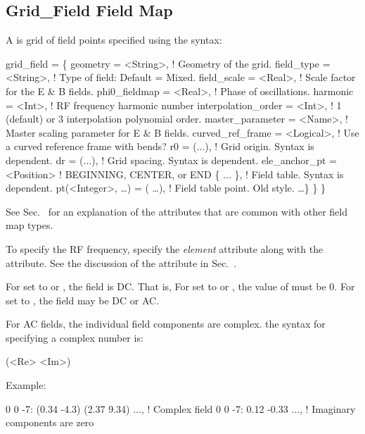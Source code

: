 \subsection{Grid_Field Field Map}
\label{s:grid.field}

A  is grid of field points specified using the syntax:
\begin{example}
  grid_field = \{ 
    geometry         = <String>,    ! Geometry of the grid.
    field_type       = <String>,    ! Type of field: Default = Mixed.
    field_scale      = <Real>,      ! Scale factor for the E & B fields.
    phi0_fieldmap    = <Real>,      ! Phase of oscillations.
    harmonic         = <Int>,       ! RF frequency harmonic number 
    interpolation_order = <Int>,    ! 1 (default) or 3 interpolation polynomial order.
    master_parameter = <Name>,      ! Master scaling parameter for E & B fields.
    curved_ref_frame = <Logical>,   ! Use a curved reference frame with bends?
    r0   = (...),                   ! Grid origin. Syntax is  dependent.
    dr   = (...),                   ! Grid spacing. Syntax is  dependent.
    ele_anchor_pt = <Position>      ! BEGINNING, CENTER, or END
    \{ ... \},                      ! Field table. Syntax is  dependent.
    pt(<Integer>, \dots) = ( \ldots ), ! Field table point. Old style.
    \ldots \} \} \}
\end{example}
See Sec.~ for an explanation of the attributes that are common with
other field map types.

To specify the RF frequency, specify the  {\em element} attribute along with
the  attribute. See the discussion of the  attribute in 
Sec.~.

For  set to  or , the field is DC. That is, For
 set to  or , the value of  must be
0. For  set to , the field may be DC or AC. 

For AC fields, the individual field components are complex.  the syntax for specifying a complex
number is:
\begin{example}
  (<Re> <Im>)
\end{example}
Example:
\begin{example}
  0 0 -7: (0.34 -4.3) (2.37 9.34) ...,    ! Complex field
  0 0 -7: 0.12 -0.33 ...,                 ! Imaginary components are zero
\end{example}

